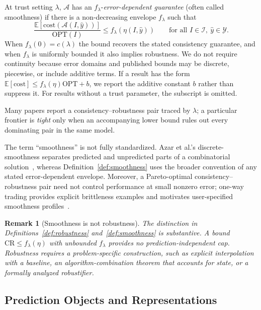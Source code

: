 \documentclass[acmsmall,screen,nonacm]{acmart}
\theoremstyle{acmdefinition}%
\newtheorem{remark}[theorem]{Remark}%
\begin{document}
\begin{definition}[Smoothness]
\label{def:smoothness}
At trust setting $\lambda$, $\mathcal{A}$ has an $f_\lambda$-\emph{error-dependent guarantee} (often called smoothness) if there is a non-decreasing envelope $f_\lambda$ such that
\begin{equation}
    \frac{\mathbb{E}[\mathrm{cost}(\mathcal{A}(I, \hat{y}))]}{\mathrm{OPT}(I)} \leq f_\lambda(\eta(I,\hat y))
    \qquad \text{for all } I \in \mathcal{I},\ \hat{y} \in \mathcal{Y}.
    \label{eq_smooth}
\end{equation}
When $f_\lambda(0)=c(\lambda)$ the bound recovers the stated consistency guarantee, and when $f_\lambda$ is uniformly bounded it also implies robustness. We do not require continuity because error domains and published bounds may be discrete, piecewise, or include additive terms. If a result has the form $\mathbb{E}[\mathrm{cost}]\le f_\lambda(\eta)\mathrm{OPT}+b$, we report the additive constant $b$ rather than suppress it. For results without a trust parameter, the subscript is omitted.
\end{definition}

Many papers report a consistency--robustness pair traced by $\lambda$; a particular frontier is \emph{tight} only when an accompanying lower bound rules out every dominating pair in the same model.

The term ``smoothness'' is not fully standardized. Azar et al.'s discrete-smoothness separates predicted and unpredicted parts of a combinatorial solution~\cite{azar2023discrete}, whereas Definition~\ref{def:smoothness} uses the broader convention of any stated error-dependent envelope. Moreover, a Pareto-optimal consistency--robustness pair need not control performance at small nonzero error; one-way trading provides explicit brittleness examples and motivates user-specified smoothness profiles~\cite{elenter2024brittleness}.

\begin{remark}[Smoothness is not robustness]
\label{rem:smooth_not_robust}
The distinction in Definitions~\ref{def:robustness} and~\ref{def:smoothness} is substantive. A bound $\mathrm{CR}\le f_\lambda(\eta)$ with unbounded $f_\lambda$ provides no prediction-independent cap. Robustness requires a problem-specific construction, such as explicit interpolation with a baseline, an algorithm-combination theorem that accounts for state, or a formally analyzed robustifier.
\end{remark}

\subsection{Prediction Objects and Representations}
\label{subsec:predtypes}
\end{document}
